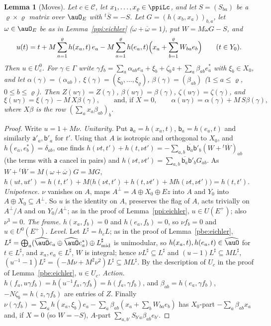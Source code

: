\documentclass[10pt]{amsart}
\newtheorem{lemma}[theorem]{Lemma}
\theoremstyle{definition}
\theoremstyle{remark}
\providecommand{\aubar}[1]{\overline{#1}}
\begin{document}
\begin{lemma}[Moves]\label{pbc:moves}
Let $c\in\mathcal C$, let $x_1,\dots,x_\varrho\in\ppiLc$, and let $S=(S_{ba})$ be a $\varrho\times\varrho$
matrix over $\auO_E$ with ${}^t\aubar S=-S$. Let $G=(h(x_b,x_a))_{b,a}$, let $\omega\in\auO_E$ be as in
Lemma~\ref{ppi:eichler} ($\omega+\aubar\omega=1$), put $W=M\omega G-S$, and
\[
u(t)=t+M\sum_{a=1}^\varrho h(x_a,t)\,e_a-M\sum_{a=1}^\varrho h(e_a,t)\Bigl(x_a+\sum_{b=1}^\varrho W_{ba}
e_b\Bigr)\qquad(t\in Y_0).
\]
Then $u\in U_c^0$. For $\gamma\in\Gamma$ write $\gamma f_b=\sum_a\alpha_{ab}e_a+\xi_b+\zeta_bz+\sum_a
\beta_{ab}e_a^*$ with $\xi_b\in X_0$, and let $\alpha(\gamma)=(\alpha_{ab})$, $\xi(\gamma)=(\xi_0,\dots,
\xi_\varrho)$, $\beta(\gamma)=(\beta_{ab})$ ($1\le a\le\varrho$, $0\le b\le\varrho$). Then $Z(u\gamma)=Z(
\gamma)$, $\beta(u\gamma)=\beta(\gamma)$, $\zeta(u\gamma)=\zeta(\gamma)$, and
\[
\xi(u\gamma)=\xi(\gamma)-M\,X\beta(\gamma),\qquad\text{and, if }X=0,\qquad\alpha(u\gamma)=\alpha(\gamma)+
M\,S\beta(\gamma),
\]
where $X\beta$ is the row $(\sum_ax_a\beta_{ab})_b$.
\end{lemma}
\begin{proof}
Write $u=1+M\nu$. \emph{Unitarity.} Put $\mathsf a_a=h(x_a,t)$, $\mathsf b_a=h(e_a,t)$ and similarly
$\mathsf a'_a,\mathsf b'_a$ for $t'$. Using that $A$ is isotropic and orthogonal to $X_0$, and $h(e_a,
e_b^*)=\delta_{ab}$, one finds $h(\nu t,t')+h(t,\nu t')=-\sum_{a,b}\aubar{\mathsf b_a}\mathsf b'_b(W+
{}^t\aubar W)_{ab}$ (the terms with $\mathsf a$ cancel in pairs) and $h(\nu t,\nu t')=\sum_{a,b}
\aubar{\mathsf b_a}\mathsf b'_bG_{ab}$. As $W+{}^t\aubar W=M(\omega+\aubar\omega)G=MG$, $h(ut,ut')=h(t,
t')+M\bigl(h(\nu t,t')+h(t,\nu t')+Mh(\nu t,\nu t')\bigr)=h(t,t')$. \emph{Unipotence.} $\nu$ vanishes on
$A$, maps $A^\perp=A\oplus X_0\oplus Ez$ into $A$ and $Y_0$ into $A\oplus X_0\subseteq A^\perp$. So $u$
is the identity on $A$, preserves the flag of $A$, acts trivially on $A^\perp/A$ and on $Y_0/A^\perp$;
as in the proof of Lemma~\ref{ppi:eichler}, $u\in U(E^+)$; also $\nu^3=0$. \emph{The frame.} $h(x_a,
f_b)=0$ and $h(e_a,f_b)=0$, so $\nu f_b=0$ and $u\in U^0(E^+)$. \emph{Level.} Let $L^\sharp=h_cL$; as
in the proof of Lemma~\ref{pbe:eichler}, $L^\sharp=\bigoplus_a(\widehat\auO e_a\oplus\widehat\auO
e_a^*)\oplus L^\sharp_{\rm mid}$ is unimodular, so $h(x_a,t),h(e_a,t)\in\widehat\auO$ for $t\in
L^\sharp$, and $x_a,e_a\in L^\sharp$, $W$ is integral; hence $\nu L^\sharp\subseteq L^\sharp$ and $(u-1)
L^\sharp\subseteq ML^\sharp$, $(u^{-1}-1)L^\sharp=(-M\nu+M^2\nu^2)L^\sharp\subseteq ML^\sharp$. By the
description of $U_c$ in the proof of Lemma~\ref{pbe:eichler}, $u\in U_c$.
\emph{Action.} $h(f_a,u\gamma f_b)=h(u^{-1}f_a,\gamma f_b)=h(f_a,\gamma f_b)$, and $\beta_{ab}=h(e_a,
\gamma f_b)$, $-N\zeta_b=h(z,\gamma f_b)$ are entries of $Z$. Finally $\nu(\gamma f_b)=\sum_a h(x_a,
\xi_b)e_a-\sum_a\beta_{ab}(x_a+\sum_bW_{ba}e_b)$ has $X_0$-part $-\sum_a\beta_{ab}x_a$ and, if $X=0$
(so $W=-S$), $A$-part $\sum_{a,b'}S_{b'a}\beta_{ab}e_{b'}$.
\end{proof}
\end{document}

